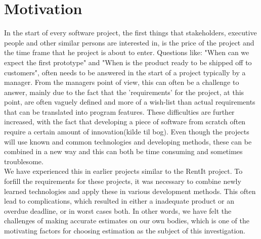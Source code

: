\section{Motivation}
In the start of every software project, the first things that stakeholders, executive people and other similar persons are interested in, is the price of the project and the time frame that he project is about to enter. Questions like: "When can we expect the first prototype" and "When is the product ready to be shipped off to customers", often needs to be answered in the start of a project typically by a manager. From the managers point of view, this can often be a challenge to answer, mainly due to the fact that the 'requirements' for the project, at this point, are often vaguely defined and more of a wish-list than actual requirements that can be translated into program features. These difficulties are further increased, with the fact that developing a piece of software from scratch often require a certain amount of innovation(kilde til bog). Even though the projects will use known and common technologies and developing methods, these can be combined in a new way and this can both be time consuming and sometimes troublesome.\\ We have experienced this in earlier projects similar to the RentIt project. To forfill the requirements for these projects, it was necessary to combine newly learned technologies and apply these in various development methods. This often lead to  complications, which resulted in either a inadequate product or an overdue deadline, or in worst cases both. In other words, we have felt the challenges of making accurate estimates on our own bodies, which is one of the motivating factors for choosing estimation as the subject of this investigation.\\

